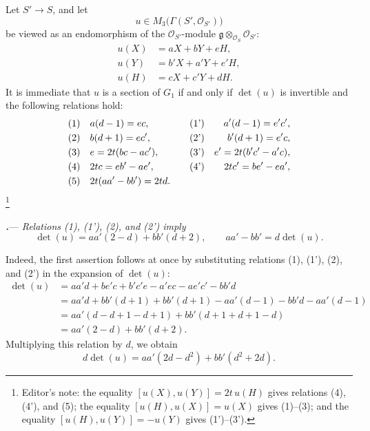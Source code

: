 Let \(S'\to S\), and let
\[
  u\in M_3\bigl(\Gamma(S',\mathcal O_{S'})\bigr)
\]
be viewed as an endomorphism of the \(\mathcal O_{S'}\)-module
\(\mathfrak g\otimes_{\mathcal O_S}\mathcal O_{S'}\):
\[
  \begin{aligned}
  u(X)&=aX+bY+eH,\\
  u(Y)&=b'X+a'Y+e'H,\\
  u(H)&=cX+c'Y+dH.
  \end{aligned}
\]
It is immediate that \(u\) is a section of \(G_1\) if and only if
\(\det(u)\) is invertible and the following relations hold:
\[
\begin{alignedat}{4}
  \textup{(1)}\quad&a(d-1)=ec,
  &\qquad&
  \textup{(1')}\quad&a'(d-1)=e'c',\\
  \textup{(2)}\quad&b(d+1)=ec',
  &&
  \textup{(2')}\quad&b'(d+1)=e'c,\\
  \textup{(3)}\quad&e=2t(bc-ac'),
  &&
  \textup{(3')}\quad&e'=2t(b'c'-a'c),\\
  \textup{(4)}\quad&2tc=eb'-ae',
  &&
  \textup{(4')}\quad&2tc'=be'-ea',\\
  \textup{(5)}\quad&2t(aa'-bb')=2td.&&&
\end{alignedat}
\]
\footnote{Editor's note: the equality
\([u(X),u(Y)]=2t\,u(H)\) gives relations \textup{(4)},
\textup{(4')}, and \textup{(5)}; the equality
\([u(H),u(X)]=u(X)\) gives \textup{(1)--(3)}; and the equality
\([u(H),u(Y)]=-u(Y)\) gives \textup{(1')--(3')}.}

\par\medskip\noindent
{}\textbf{\textit{.}}---
\textit{Relations \textup{(1)}, \textup{(1')}, \textup{(2)}, and
\textup{(2')} imply}
\[
  \det(u)=aa'(2-d)+bb'(d+2),
  \qquad
  aa'-bb'=d\det(u).
\]

Indeed, the first assertion follows at once by substituting
relations \textup{(1)}, \textup{(1')}, \textup{(2)}, and
\textup{(2')} in the expansion of \(\det(u)\):
\[
\begin{aligned}
  \det(u)
  &=aa'd+be'c+b'c'e-a'ec-ae'c'-bb'd\\
  &=aa'd+bb'(d+1)+bb'(d+1)
    -aa'(d-1)-bb'd-aa'(d-1)\\
  &=aa'(d-d+1-d+1)+bb'(d+1+d+1-d)\\
  &=aa'(2-d)+bb'(d+2).
\end{aligned}
\]
Multiplying this relation by \(d\), we obtain
\[
  d\det(u)=aa'(2d-d^2)+bb'(d^2+2d).
\]



